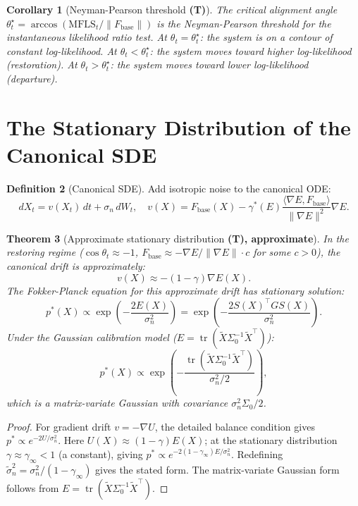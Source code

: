 \documentclass[11pt,a4paper]{article}
\newtheorem{theorem}{Theorem}[section]
\newtheorem{corollary}[theorem]{Corollary}
\theoremstyle{definition}
\newtheorem{definition}[theorem]{Definition}
\newcommand{\Fbase}{F_{\mathrm{base}}}
\begin{document}
\begin{corollary}[Neyman-Pearson threshold \textbf{(T)}]
The critical alignment angle $\theta_t^\star = \arccos(\mathrm{MFLS}_t/\|\Fbase\|)$
is the Neyman-Pearson threshold for the instantaneous likelihood ratio test.
At $\theta_t = \theta_t^\star$: the system is on a contour of constant log-likelihood.
At $\theta_t < \theta_t^\star$: the system moves toward higher log-likelihood (restoration).
At $\theta_t > \theta_t^\star$: the system moves toward lower log-likelihood (departure).
\end{corollary}

\section{The Stationary Distribution of the Canonical SDE}
\label{sec:stationary}

\begin{definition}[Canonical SDE]
Add isotropic noise to the canonical ODE:
\[
dX_t = v(X_t)\,dt + \sigma_n\,dW_t, \quad
v(X) = \Fbase(X) - \gamma^*(E)\frac{\langle\nabla E, \Fbase\rangle}{\|\nabla E\|^2}\nabla E.
\]
\end{definition}

\begin{theorem}[Approximate stationary distribution \textbf{(T), approximate}]
\label{thm:stationary}
In the restoring regime ($\cos\theta_t \approx -1$, $\Fbase \approx -\nabla E/\|\nabla E\|\cdot c$
for some $c>0$), the canonical drift is approximately:
\[
v(X) \approx -(1-\gamma)\nabla E(X).
\]
The Fokker-Planck equation for this approximate drift has stationary solution:
\[
p^*(X) \propto \exp\!\left(-\frac{2E(X)}{\sigma_n^2}\right)
= \exp\!\left(-\frac{2S(X)^\top GS(X)}{\sigma_n^2}\right).
\]
Under the Gaussian calibration model ($E = \operatorname{tr}(\tilde X\Sigma_0^{-1}\tilde X^\top)$):
\[
p^*(X) \propto \exp\!\left(-\frac{\operatorname{tr}(\tilde X\Sigma_0^{-1}\tilde X^\top)}{\sigma_n^2/2}\right),
\]
which is a matrix-variate Gaussian with covariance $\sigma_n^2\Sigma_0/2$.
\end{theorem}

\begin{proof}
For gradient drift $v = -\nabla U$, the detailed balance condition gives
$p^* \propto e^{-2U/\sigma_n^2}$.
Here $U(X) \approx (1-\gamma)E(X)$; at the stationary distribution
$\gamma \approx \gamma_\infty < 1$ (a constant), giving
$p^* \propto e^{-2(1-\gamma_\infty)E/\sigma_n^2}$.
Redefining $\tilde\sigma_n^2 = \sigma_n^2/(1-\gamma_\infty)$ gives the stated form.
The matrix-variate Gaussian form follows from $E = \operatorname{tr}(\tilde X\Sigma_0^{-1}\tilde X^\top)$.
\end{proof}
\end{document}
